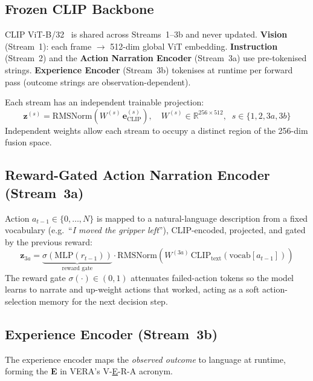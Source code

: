\documentclass{article}
\newcommand{\modelname}{\textsc{VERA}\xspace}
\begin{document}
\subsection{Frozen CLIP Backbone}

CLIP ViT-B/32~\citep{radford2021clip,dosovitskiy2021vit} is shared
across Streams~1--3b and never updated.
\textbf{Vision} (Stream~1): each frame $\to$ 512-dim global ViT embedding.
\textbf{Instruction} (Stream~2) and the \textbf{Action Narration Encoder} (Stream~3a)
use pre-tokenised strings.
\textbf{Experience Encoder} (Stream~3b) tokenises at runtime per
forward pass (outcome strings are observation-dependent).

Each stream has an independent trainable projection:
\begin{equation}
  \mathbf{z}^{(s)} = \mathrm{RMSNorm}(W^{(s)}\,\mathbf{e}^{(s)}_{\mathrm{CLIP}}),
  \quad W^{(s)}\!\in\!\mathbb{R}^{256\times512}, \;\; s\in\{1,2,3a,3b\}
  \label{eq:proj}
\end{equation}
Independent weights allow each stream to occupy a distinct region of the
256-dim fusion space.

\subsection{Reward-Gated Action Narration Encoder (Stream~3a)}

Action $a_{t-1}\!\in\!\{0,\ldots,N\}$ is mapped to a natural-language
description from a fixed vocabulary (e.g.\ ``\emph{I moved the gripper left}''),
CLIP-encoded, projected, and gated by the previous reward:
\begin{equation}
  \mathbf{z}_{3a} = \underbrace{\sigma\!\left(\mathrm{MLP}(r_{t-1})\right)}_{\text{reward gate}} \cdot
                    \mathrm{RMSNorm}(W^{(3a)}\,
                    \mathrm{CLIP}_{\mathrm{text}}(\mathrm{vocab}[a_{t-1}]))
  \label{eq:action_enc}
\end{equation}
The reward gate $\sigma(\cdot)\!\in\!(0,1)$ attenuates failed-action
tokens so the model learns to narrate and up-weight actions that
worked, acting as a soft action-selection memory for the next decision step.

\subsection{Experience Encoder (Stream~3b)}
\label{sec:experience}
\label{sec:consequence}  %

The experience encoder maps the \emph{observed outcome} to language at
runtime, forming the \textbf{E} in \modelname's V-\underline{E}-R-A acronym.
\end{document}
